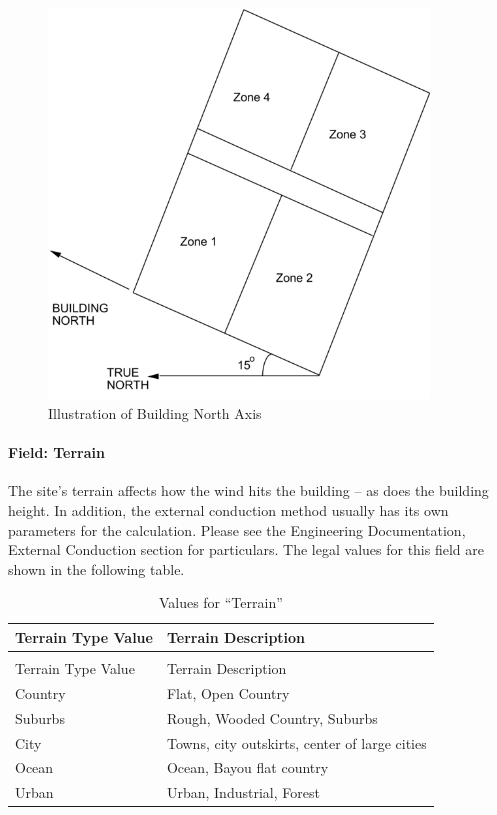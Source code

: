 \begin{figure}[hbtp] %
\centering
\includegraphics[width=0.9\textwidth, height=0.9\textheight, keepaspectratio=true]{media/image001.png}
\caption{Illustration of Building North Axis \protect \label{fig:illustration-of-building-north-axis}}
\end{figure}

\paragraph{Field: Terrain}\label{field-terrain}

The site's terrain affects how the wind hits the building -- as does the building height. In addition, the external conduction method usually has its own parameters for the calculation. Please see the Engineering Documentation, External Conduction section for particulars. The legal values for this field are shown in the following table.

\begin{longtable}[c]{@{}ll@{}}
\caption{Values for ``Terrain'' \label{table:values-for-terrain}} \tabularnewline
\toprule
Terrain Type Value & Terrain Description \tabularnewline
\midrule
\endfirsthead

\caption[]{Values for ``Terrain''} \tabularnewline
\toprule
Terrain Type Value & Terrain Description \tabularnewline
\midrule
\endhead

Country & Flat, Open Country \tabularnewline
Suburbs & Rough, Wooded Country, Suburbs \tabularnewline
City & Towns, city outskirts, center of large cities \tabularnewline
Ocean & Ocean, Bayou flat country \tabularnewline
Urban & Urban, Industrial, Forest \tabularnewline
\bottomrule
\end{longtable}

